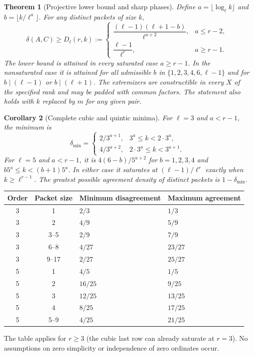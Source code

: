\documentclass[11pt]{article}
\newtheorem{theorem}{Theorem}[section]
\newtheorem{corollary}[theorem]{Corollary}
\theoremstyle{remark}\newtheorem{remark}[theorem]{Remark}
\begin{document}
\begin{theorem}[Projective lower bound and sharp phases]\label{thm:main}
Define $a=\lfloor\log_\ell k\rfloor$ and $b=\lfloor k/\ell^a\rfloor$. For any distinct packets of size $k$,
\begin{equation}\label{eq:main}
\delta(A,C)\ge D_\ell(r,k):=
\begin{cases}
\dfrac{(\ell-1)(\ell+1-b)}{\ell^{a+2}},&a\le r-2,\\[6pt]
\dfrac{\ell-1}{\ell^r},&a\ge r-1.
\end{cases}
\end{equation}
The lower bound is attained in every saturated case $a\ge r-1$. In the nonsaturated case it is attained for all admissible $b$ in $\{1,2,3,4,6,\ell-1\}$ and for $b\mid(\ell-1)$ or $b\mid(\ell+1)$. The extremizers are constructible in every $X$ of the specified rank and may be padded with common factors. The statement also holds with $k$ replaced by $m$ for any given pair.
\end{theorem}

\begin{corollary}[Complete cubic and quintic minima]\label{cor:exact}
For $\ell=3$ and $a<r-1$, the minimum is
\[
\delta_{\min}=
\begin{cases}2/3^{a+1},&3^a\le k<2\cdot3^a,\\
4/3^{a+2},&2\cdot3^a\le k<3^{a+1}.
\end{cases}
\]
For $\ell=5$ and $a<r-1$, it is $4(6-b)/5^{a+2}$ for $b=1,2,3,4$ and $b5^a\le k<(b+1)5^a$. In either case it saturates at $(\ell-1)/\ell^r$ exactly when $k\ge\ell^{r-1}$. The greatest possible agreement density of distinct packets is $1-\delta_{\min}$.
\end{corollary}

\begin{center}
\small
\begin{tabular}{ccll}
\toprule
Order & Packet size & Minimum disagreement & Maximum agreement\\
\midrule
3 & 1 & $2/3$ & $1/3$\\
3 & 2 & $4/9$ & $5/9$\\
3 & 3--5 & $2/9$ & $7/9$\\
3 & 6--8 & $4/27$ & $23/27$\\
3 & 9--17 & $2/27$ & $25/27$\\
5 & 1 & $4/5$ & $1/5$\\
5 & 2 & $16/25$ & $9/25$\\
5 & 3 & $12/25$ & $13/25$\\
5 & 4 & $8/25$ & $17/25$\\
5 & 5--9 & $4/25$ & $21/25$\\
\bottomrule
\end{tabular}
\end{center}
\noindent The table applies for $r\ge3$ (the cubic last row can already saturate at $r=3$). No assumptions on zero simplicity or independence of zero ordinates occur.
\end{document}
